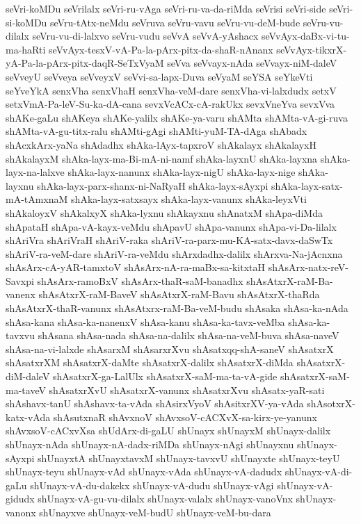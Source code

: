 {seVri-koMDu
seVrilalx
seVri-ru-vAga
seVri-ru-va-da-riMda
seVrisi
seVri-side
seVri-si-koMDu
seVru-tAtx-neMdu
seVruva
seVru-vavu
seVru-vu-deM-bude
seVru-vu-dilalx
seVru-vu-di-lalxvo
seVru-vudu
seVvA
seVvA-yAshacx
seVvAyx-daBx-vi-tu-ma-haRti
seVvAyx-tesxV-vA-Pa-la-pArx-pitx-da-shaR-nAnanx
seVvAyx-tikxrX-yA-Pa-la-pArx-pitx-daqR-SeTxVyaM
seVva
seVvayx-nAda
seVvayx-niM-daleV
seVveyU
seVveya
seVveyxV
seVvi-sa-lapx-Duva
seVyaM
seYSA
seYkeVti
seYveYkA
senxVha
senxVhaH
senxVha-veM-dare
senxVha-vi-lalxdudx
setxV
setxVmA-Pa-leV-Su-ka-dA-cana
sevxVcACx-cA-rakUkx
sevxVneYva
sevxVva
shAKe-gaLu
shAKeya
shAKe-yalilx
shAKe-ya-varu
shAMta
shAMta-vA-gi-ruva
shAMta-vA-gu-titx-ralu
shAMti-gAgi
shAMti-yuM-TA-dAga
shAbadx
shAcxkArx-yaNa
shAdadhx
shAka-lAyx-tapxroV
shAkalayx
shAkalayxH
shAkalayxM
shAka-layx-ma-Bi-mA-ni-namf
shAka-layxnU
shAka-layxna
shAka-layx-na-lalxve
shAka-layx-nanunx
shAka-layx-nigU
shAka-layx-nige
shAka-layxnu
shAka-layx-parx-shanx-ni-NaRyaH
shAka-layx-sAyxpi
shAka-layx-satx-mA-tAmxnaM
shAka-layx-satxsayx
shAka-layx-vanunx
shAka-leyxVti
shAkaloyxV
shAkalxyX
shAka-lyxnu
shAkayxnu
shAnatxM
shApa-diMda
shApataH
shApa-vA-kayx-veMdu
shApavU
shApa-vanunx
shApa-vi-Da-lilalx
shAriVra
shAriVraH
shAriV-raka
shAriV-ra-parx-mu-KA-satx-davx-daSwTx
shAriV-ra-veM-dare
shAriV-ra-veMdu
shArxdadhx-dalilx
shArxva-Na-jAcnxna
shAsArx-cA-yAR-tamxtoV
shAsArx-nA-ra-maBx-sa-kitxtaH
shAsArx-natx-reV-Savxpi
shAsArx-ramoBxV
shAsArx-thaR-saM-banadhx
shAsAtxrX-raM-Ba-vanenx
shAsAtxrX-raM-BaveV
shAsAtxrX-raM-Bavu
shAsAtxrX-thaRda
shAsAtxrX-thaR-vanunx
shAsAtxrx-raM-Ba-veM-budu
shAsaka
shAsa-ka-nAda
shAsa-kana
shAsa-ka-nanenxV
shAsa-kanu
shAsa-ka-tavx-veMba
shAsa-ka-tavxvu
shAsana
shAsa-nada
shAsa-na-dalilx
shAsa-na-veM-buva
shAsa-naveV
shAsa-na-vi-lalxde
shAsarxM
shAsarxrXvu
shAsatxqq-shA-saneV
shAsatxrX
shAsatxrXM
shAsatxrX-daMte
shAsatxrX-dalilx
shAsatxrX-diMda
shAsatxrX-diM-daleV
shAsatxrX-ga-LalUlx
shAsatxrX-saM-ma-ta-vA-gide
shAsatxrX-saM-ma-taveV
shAsatxrXvU
shAsatxrX-vanunx
shAsatxrXvu
shAsatx-yaR-sati
shAshavx-tanU
shAshavx-ta-vAda
shAsirxVyoV
shAsitxrXV-ya-vAda
shAsotxrX-katx-vAda
shAsutxnaR
shAvxnoV
shAvxsoV-cACXvX-sa-kirx-ye-yanunx
shAvxsoV-cACxvXsa
shUdArx-di-gaLU
shUnayx
shUnayxM
shUnayx-dalilx
shUnayx-nAda
shUnayx-nA-dadx-riMDa
shUnayx-nAgi
shUnayxnu
shUnayx-sAyxpi
shUnayxtA
shUnayxtavxM
shUnayx-tavxvU
shUnayxte
shUnayx-teyU
shUnayx-teyu
shUnayx-vAd
shUnayx-vAda
shUnayx-vA-dadudx
shUnayx-vA-di-gaLu
shUnayx-vA-du-dakekx
shUnayx-vA-dudu
shUnayx-vAgi
shUnayx-vA-gidudx
shUnayx-vA-gu-vu-dilalx
shUnayx-valalx
shUnayx-vanoVnx
shUnayx-vanonx
shUnayxve
shUnayx-veM-budU
shUnayx-veM-bu-dara
}
